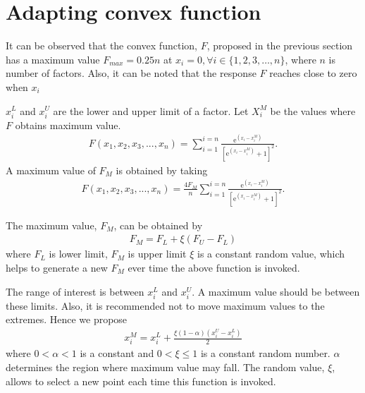 \documentclass[twocolumn]{svjour3}          %
\newcommand{\me}{\mathrm{e}}
\begin{document}
\section{Adapting convex function}
\label{Sec:Adapting}
It can be observed that the convex function, $F$, proposed in the previous section has a maximum value $F_{max}=0.25n$ at $x_i=0, \forall i\in\{1, 2, 3, \dots, n\}$, where $n$ is number of factors. Also, it can be noted that the response $F$ reaches close to zero when $x_i$
\par
$x_i^L$ and $x_i^U$ are the lower and upper limit of a factor. Let $X_i^M$ be the values where $F$ obtains maximum value.
\begin{eqnarray}
	F(x_1, x_2, x_3, ..., x_n) = \sum_{i=1}^{i=n}{\frac{\me^{(x_i-x_i^M)}}{[\me^{(x_i-x_i^M)}+1]^2}}. \label{Eqn:DiffSigmoidMultiChangeMaxPoint}
\end{eqnarray}
A maximum value of $F_M$ is obtained by taking
\begin{eqnarray}
	F(x_1, x_2, x_3, ..., x_n) = \frac{4F_M}{n}\sum_{i=1}^{i=n}{\frac{\me^{(x_i-x_i^M)}}{[\me^{(x_i-x_i^M)}+1]^2}}. \label{Eqn:DiffSigmoidMultiChangeMaxValue}
\end{eqnarray}
\par
The maximum value, $F_M$, can be obtained by
\begin{eqnarray}
	F_M = F_L + \xi(F_U-F_L) \label{Eqn:MaxValueSelection}
\end{eqnarray}
where $F_L$ is lower limit, $F_M$ is upper limit $\xi$ is a constant random value, which helps to generate a new $F_M$ ever time the above function is invoked.
\par
The range of interest is between $x_i^L$ and $x_i^U$. A maximum value should be between these limits. Also, it is recommended not to move maximum values to the extremes. Hence we propose
\begin{eqnarray}
	x_i^M = x_i^L + \frac{\xi(1-\alpha)(x_i^U-x_i^L)}{2} \label{Eqn:MaxPointSelection}
\end{eqnarray}
where $0<\alpha <1$ is a constant and $0<\xi\le 1$ is a constant random number. $\alpha$ determines the region where maximum value may fall. The random value, $\xi$, allows to select a new point each time this function is invoked.
\end{document}
